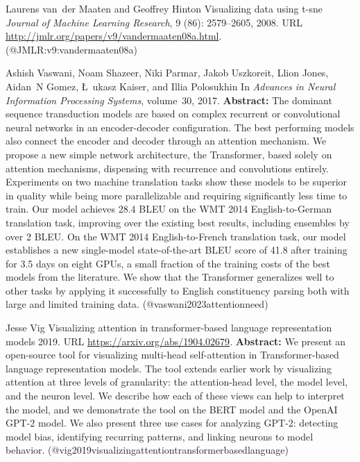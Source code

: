\documentclass{article} %
\begin{document}
\begin{thebibliography}{}
 Laurens van~der Maaten and Geoffrey Hinton \newblock Visualizing data using t-sne \newblock \emph{Journal of Machine Learning Research}, 9 (86): 2579--2605, 2008. \newblock URL \url{http://jmlr.org/papers/v9/vandermaaten08a.html}. \newblock (@JMLR:v9:vandermaaten08a)

 Ashish Vaswani, Noam Shazeer, Niki Parmar, Jakob Uszkoreit, Llion Jones, Aidan~N Gomez, \L~ukasz Kaiser, and Illia Polosukhin  \newblock In \emph{Advances in Neural Information Processing Systems}, volume~30, 2017. \newblock \textbf{Abstract:} The dominant sequence transduction models are based on complex recurrent or convolutional neural networks in an encoder-decoder configuration. The best performing models also connect the encoder and decoder through an attention mechanism. We propose a new simple network architecture, the Transformer, based solely on attention mechanisms, dispensing with recurrence and convolutions entirely. Experiments on two machine translation tasks show these models to be superior in quality while being more parallelizable and requiring significantly less time to train. Our model achieves 28.4 BLEU on the WMT 2014 English-to-German translation task, improving over the existing best results, including ensembles by over 2 BLEU. On the WMT 2014 English-to-French translation task, our model establishes a new single-model state-of-the-art BLEU score of 41.8 after training for 3.5 days on eight GPUs, a small fraction of the training costs of the best models from the literature. We show that the Transformer generalizes well to other tasks by applying it successfully to English constituency parsing both with large and limited training data. \newblock (@vaswani2023attentionneed)

 Jesse Vig \newblock Visualizing attention in transformer-based language representation models 2019. \newblock URL \url{https://arxiv.org/abs/1904.02679}. \newblock \textbf{Abstract:} We present an open-source tool for visualizing multi-head self-attention in Transformer-based language representation models. The tool extends earlier work by visualizing attention at three levels of granularity: the attention-head level, the model level, and the neuron level. We describe how each of these views can help to interpret the model, and we demonstrate the tool on the BERT model and the OpenAI GPT-2 model. We also present three use cases for analyzing GPT-2: detecting model bias, identifying recurring patterns, and linking neurons to model behavior. \newblock (@vig2019visualizingattentiontransformerbasedlanguage)


\end{thebibliography}
\end{document}

